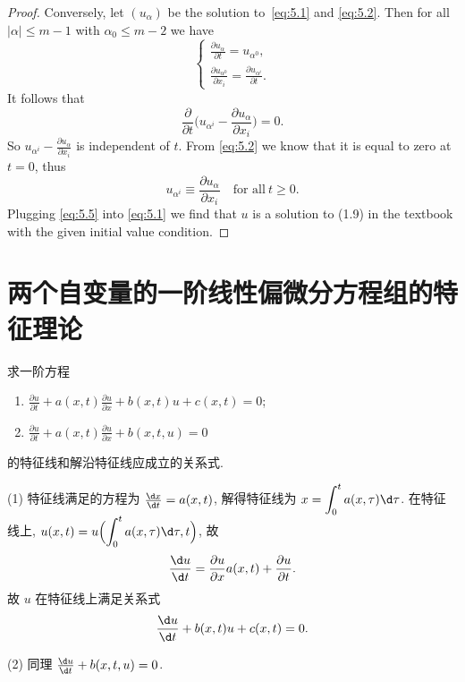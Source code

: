 \begin{proof}
  Conversely, let $(u_\alpha)$ be the solution to~\eqref{eq:5.1} and \eqref{eq:5.2}.
  Then for all $|\alpha|\leq m-1$ with $\alpha_0\leq m-2$ we have
  \begin{equation}\label{eq:5.3}
    \begin{cases}
      \frac{\partial u_\alpha}{\partial t} = u_{\alpha^0}, \\
      \frac{\partial u_{\alpha^0}}{\partial x_i} = \frac{\partial u_{\alpha^i}}{\partial t}.
    \end{cases}
  \end{equation}
  It follows that
  \begin{equation}\label{eq:5.4}
    \frac{\partial}{\partial t}\biggl(u_{\alpha^i} - \frac{\partial u_\alpha}{\partial x_i}\biggr)
      = 0.
  \end{equation}
  So $u_{\alpha^i} - \frac{\partial u_\alpha}{\partial x_i}$ is independent of $t$.
  From \eqref{eq:5.2} we know that it is equal to zero at $t=0$, thus
  \begin{equation}\label{eq:5.5}
    u_{\alpha^i} \equiv \frac{\partial u_\alpha}{\partial x_i} \quad \text{for all}\ t\geq 0.
  \end{equation}
  Plugging \eqref{eq:5.5} into \eqref{eq:5.1} we find that $u$ is a solution to (1.9)
  in the textbook with the given initial value condition.
\end{proof}

\section{两个自变量的一阶线性偏微分方程组的特征理论}

\begin{exercise}
  求一阶方程
  \begin{enumerate}[(1)]
    \item $\displaystyle\frac{\partial u}{\partial t} + a(x,t) \frac{\partial u}{\partial x} + b(x,t)u + c(x,t) = 0$;
    \item $\displaystyle\frac{\partial u}{\partial t} + a(x,t) \frac{\partial u}{\partial x} + b(x,t,u) = 0$
  \end{enumerate}
  的特征线和解沿特征线应成立的关系式.
\end{exercise}

\begin{solve}
  (1) 特征线满足的方程为 $\frac{\d x}{\d t} = a(x,t)$,
  解得特征线为 $\displaystyle x = \int_0^t a(x,\tau) \d\tau$.
  在特征线上, $\displaystyle u(x,t) = u\Bigl(\int_0^t a(x, \tau) \d\tau, t\Bigr)$, 故
  \[\frac{\d u}{\d t} = \frac{\partial u}{\partial x} a(x,t)
    + \frac{\partial u}{\partial t}.\]
  故 $u$ 在特征线上满足关系式
  \[\frac{\d u}{\d t} + b(x,t)u + c(x,t) = 0.\]

  (2) 同理 $\frac{\d u}{\d t} + b(x,t,u) = 0$.
\end{solve}


